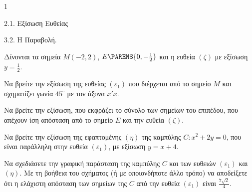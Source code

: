 \begin{ylh}{1}
    \item 2.1. Εξίσωση Ευθείας
    \item 3.2. Η Παραβολή.
\end{ylh}
Δίνονται τα σημεία $M(-2,2)$, $E\PARENS{0,-\frac{1}{2}}$ και η ευθεία $(\zeta)$ με εξίσωση $y=\frac{1}{2}$.
\begin{alist}
\item Να βρείτε την εξίσωση της ευθείας $(\varepsilon_1)$ που διέρχεται από το σημείο $M$ και σχηματίζει γωνία $45^\circ$ με τον άξονα $x'x$.  
\item Να βρείτε την εξίσωση, που εκφράζει το σύνολο των σημείων του επιπέδου, που απέχουν ίση απόσταση από το σημείο $E$ και την ευθεία $(\zeta)$. 
\item \begin{rlist}
\item Να βρείτε την εξίσωση της εφαπτομένης $(\eta)$ της καμπύλης $C: x^2+2y=0$, που είναι παράλληλη στην ευθεία $(\varepsilon_1)$, με εξίσωση $y=x+4$. 
\item Να σχεδιάσετε την γραφική παράσταση της καμπύλης $C$ και των ευθειών $(\varepsilon_1)$ και $(\eta)$. Με τη βοήθεια του σχήματος (ή με οποιονδήποτε άλλο τρόπο) να αποδείξετε ότι η ελάχιστη απόσταση των σημείων της $C$ από την ευθεία $(\varepsilon_1)$ είναι $\frac{7\sqrt{2}}{4}$. 
\end{rlist}
\end{alist}
